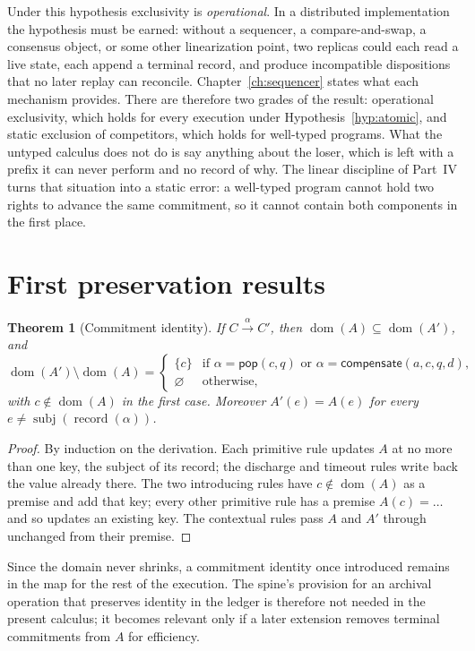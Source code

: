 \documentclass[11pt,openany]{book}
\newtheorem{theorem}{Theorem}[chapter]
\theoremstyle{remark}
\newcommand{\dom}{\operatorname{dom}}
\newcommand{\record}{\operatorname{record}}
\newcommand{\subj}{\operatorname{subj}}
\begin{document}
Under this hypothesis exclusivity is \emph{operational}. In a distributed
implementation the hypothesis must be earned: without a sequencer, a
compare-and-swap, a consensus object, or some other linearization point,
two replicas could each read a live state, each append a terminal record,
and produce incompatible dispositions that no later replay can reconcile.
Chapter~\ref{ch:sequencer} states what each mechanism provides. There are therefore two grades of the result: operational
exclusivity, which holds for every execution under
Hypothesis~\ref{hyp:atomic}, and static exclusion of competitors, which
holds for well-typed programs. What the untyped calculus does not do is say
anything about the loser, which is left with a prefix it can never perform and no
record of why. The linear discipline of Part~IV turns that situation into
a static error: a well-typed program cannot hold two rights to advance the
same commitment, so it cannot contain both components in the first place.

\section{First preservation results}

\begin{theorem}[Commitment identity]\label{thm:identity}
If $C\xrightarrow{\alpha}C'$, then $\dom(A)\subseteq\dom(A')$, and
\[
\dom(A')\setminus\dom(A)=
\begin{cases}
\{c\} & \text{if }\alpha=\mathsf{pop}(c,q)\text{ or }
         \alpha=\mathsf{compensate}(a,c,q,d),\\
\varnothing & \text{otherwise,}
\end{cases}
\]
with $c\notin\dom(A)$ in the first case. Moreover $A'(e)=A(e)$ for every
$e\neq\subj(\record(\alpha))$.
\end{theorem}

\begin{proof}
By induction on the derivation. Each primitive rule updates $A$ at no
more than one key, the subject of its record; the discharge and timeout
rules write back the value already there. The two introducing rules have
$c\notin\dom(A)$ as a premise and add that key; every other primitive rule
has a premise $A(c)=\ldots$ and so updates an existing key. The contextual
rules pass $A$ and $A'$ through unchanged from their premise.
\end{proof}

Since the domain never shrinks, a commitment identity once introduced
remains in the map for the rest of the execution. The spine's provision
for an archival operation that preserves identity in the ledger is
therefore not needed in the present calculus; it becomes relevant only if
a later extension removes terminal commitments from $A$ for efficiency.
\end{document}
